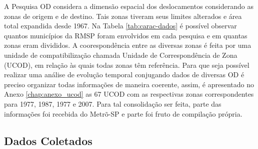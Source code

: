 A Pesquisa OD considera a dimensão espacial dos deslocamentos considerando as zonas de origem e de destino. Tais zonas tiveram seus limites alterados e área total expandida desde 1967. Na Tabela \ref{tab:carac-dados} é possível observar quantos municípios da RMSP foram envolvidos em cada pesquisa e em quantas zonas eram divididos. A coorespondência entre as diversas zonas é feita por uma unidade de compatibilização chamada Unidade de Correspondência de Zona (UCOD), em relação às quais todas zonas têm referência. Para que seja possível realizar uma análise de evolução temporal conjugando dados de diversas OD é preciso organizar todas informações de maneira coerente, assim, é apresentado no Anexo \ref{chap:anexo_ucod} as 67 UCOD  com as respectivas zonas correspondentes para 1977, 1987, 1977 e 2007. Para tal consolidação ser feita, parte das informações foi recebida do Metrõ-SP e parte foi fruto de compilação própria.


\begin{table}[htb]
\end{table}


\subsection{Dados Coletados}\label{subsec:dados-coletados}

